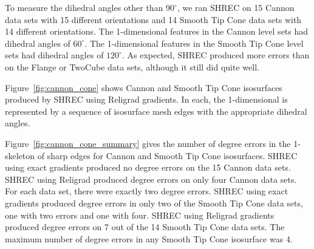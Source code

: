 To measure the dihedral angles other than $90^\circ$,
we ran SHREC on 15 Cannon data sets with 15 different orientations
and 14 Smooth Tip Cone data sets with 14 different orientations.
The 1-dimensional features in the Cannon level sets
had dihedral angles of $60^\circ$.
The 1-dimensional features in the Smooth Tip Cone level sets
had dihedral angles of $120^\circ$.
As expected, SHREC produced more errors than on the Flange or TwoCube
data sets, although it still did quite well.

Figure~\ref{fig:cannon_cone} shows Cannon and Smooth Tip Cone isosurfaces
produced by SHREC using Religrad gradients.
In each, the 1-dimensional is represented by a sequence 
of isosurface mesh edges with the appropriate dihedral angles.

Figure~\ref{fig:cannon_cone_summary} gives the number of degree errors
in the 1-skeleton of sharp edges
for Cannon and Smooth Tip Cone isosurfaces.
SHREC using exact gradients produced no degree errors 
on the 15 Cannon data sets.
SHREC using Religrad produced degree errors on only four Cannon data sets.
For each data set, there were exactly two degree errors.
SHREC using exact gradients produced degree errors in only two 
of the Smooth Tip Cone data sets,
one with two errors and one with four.
SHREC using Religrad gradients produced degree errors on 7 out of the 14
Smooth Tip Cone data sets.
The maximum number of degree errors in any Smooth Tip Cone isosurface
was 4.


